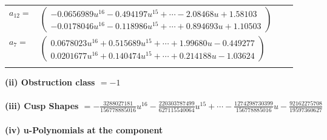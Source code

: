 \documentclass[1p]{elsarticle_modified}
\theoremstyle{definition}
\begin{document}
\begin{tabular}{m{7pt} m{180pt} m{7pt} m{180pt} }
\flushright $a_{12}=$&$\begin{pmatrix}-0.0656989 u^{16}-0.494197 u^{15}+\cdots-2.08468 u+1.58103\\-0.0178046 u^{16}-0.118986 u^{15}+\cdots+0.894693 u+1.10503\end{pmatrix}$ \\
\flushright $a_{7}=$&$\begin{pmatrix}0.0678023 u^{16}+0.515689 u^{15}+\cdots+1.99680 u-0.449277\\0.0201677 u^{16}+0.140474 u^{15}+\cdots+0.214188 u-1.03624\end{pmatrix}$\\&\end{tabular}
\flushleft \textbf{(ii) Obstruction class $= -1$}\\~\\
\flushleft \textbf{(iii) Cusp Shapes $= -\frac{3288027181}{156778885016} u^{16}-\frac{220303787499}{627115540064} u^{15}+\cdots-\frac{1274298730399}{156778885016} u-\frac{92162275708}{19597360627}$}\\~\\
\newpage\renewcommand{\arraystretch}{1}
\flushleft \textbf{(iv) u-Polynomials at the component}\newline \\
\end{document}
